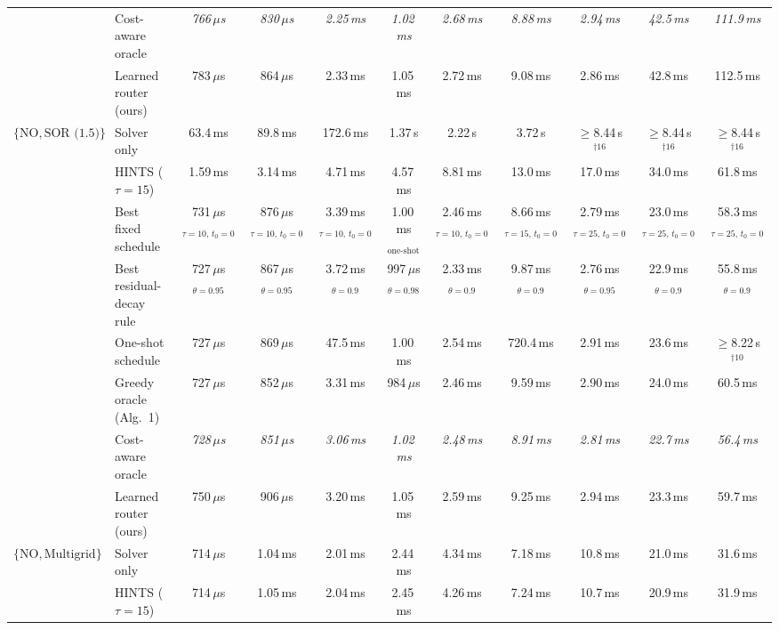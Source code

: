 {\begin{tabular}{llccccccccc}
 & Cost-aware oracle & \textit{766\,$\mu$s} & \textit{830\,$\mu$s} & \textit{2.25\,ms} & \textit{1.02\,ms} & \textit{2.68\,ms} & \textit{8.88\,ms} & \textit{2.94\,ms} & \textit{42.5\,ms} & \textit{111.9\,ms} \\
 & Learned router (ours) & 783\,$\mu$s & 864\,$\mu$s & 2.33\,ms & 1.05\,ms & 2.72\,ms & 9.08\,ms & 2.86\,ms & 42.8\,ms & 112.5\,ms \\
\midrule
$\{\mathrm{NO}, \text{SOR (1.5)}\}$ & Solver only & 63.4\,ms & 89.8\,ms & 172.6\,ms & 1.37\,s & 2.22\,s & 3.72\,s & $\geq$8.44\,s$^{\dagger 16}$ & $\geq$8.44\,s$^{\dagger 16}$ & $\geq$8.44\,s$^{\dagger 16}$ \\
 & HINTS ($\tau{=}15$) & 1.59\,ms & 3.14\,ms & 4.71\,ms & 4.57\,ms & 8.81\,ms & 13.0\,ms & 17.0\,ms & 34.0\,ms & 61.8\,ms \\
 & Best fixed schedule & 731\,$\mu$s$_{\tau{=}10,\,t_0{=}0}$ & 876\,$\mu$s$_{\tau{=}10,\,t_0{=}0}$ & 3.39\,ms$_{\tau{=}10,\,t_0{=}0}$ & 1.00\,ms$_{\text{one-shot}}$ & 2.46\,ms$_{\tau{=}10,\,t_0{=}0}$ & 8.66\,ms$_{\tau{=}15,\,t_0{=}0}$ & 2.79\,ms$_{\tau{=}25,\,t_0{=}0}$ & 23.0\,ms$_{\tau{=}25,\,t_0{=}0}$ & 58.3\,ms$_{\tau{=}25,\,t_0{=}0}$ \\
 & Best residual-decay rule & 727\,$\mu$s$_{\theta{=}0.95}$ & 867\,$\mu$s$_{\theta{=}0.95}$ & 3.72\,ms$_{\theta{=}0.9}$ & 997\,$\mu$s$_{\theta{=}0.98}$ & 2.33\,ms$_{\theta{=}0.9}$ & 9.87\,ms$_{\theta{=}0.9}$ & 2.76\,ms$_{\theta{=}0.95}$ & 22.9\,ms$_{\theta{=}0.9}$ & 55.8\,ms$_{\theta{=}0.9}$ \\
 & One-shot schedule & 727\,$\mu$s & 869\,$\mu$s & 47.5\,ms & 1.00\,ms & 2.54\,ms & 720.4\,ms & 2.91\,ms & 23.6\,ms & $\geq$8.22\,s$^{\dagger 10}$ \\
 & Greedy oracle (Alg.~1) & 727\,$\mu$s & 852\,$\mu$s & 3.31\,ms & 984\,$\mu$s & 2.46\,ms & 9.59\,ms & 2.90\,ms & 24.0\,ms & 60.5\,ms \\
 & Cost-aware oracle & \textit{728\,$\mu$s} & \textit{851\,$\mu$s} & \textit{3.06\,ms} & \textit{1.02\,ms} & \textit{2.48\,ms} & \textit{8.91\,ms} & \textit{2.81\,ms} & \textit{22.7\,ms} & \textit{56.4\,ms} \\
 & Learned router (ours) & 750\,$\mu$s & 906\,$\mu$s & 3.20\,ms & 1.05\,ms & 2.59\,ms & 9.25\,ms & 2.94\,ms & 23.3\,ms & 59.7\,ms \\
\midrule
$\{\mathrm{NO}, \text{Multigrid}\}$ & Solver only & 714\,$\mu$s & 1.04\,ms & 2.01\,ms & 2.44\,ms & 4.34\,ms & 7.18\,ms & 10.8\,ms & 21.0\,ms & 31.6\,ms \\
 & HINTS ($\tau{=}15$) & 714\,$\mu$s & 1.05\,ms & 2.04\,ms & 2.45\,ms & 4.26\,ms & 7.24\,ms & 10.7\,ms & 20.9\,ms & 31.9\,ms \\

\end{tabular}}
